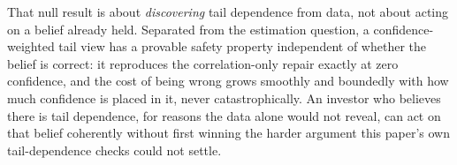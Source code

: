 \documentclass[11pt]{article}
\begin{document}
That null result is about \emph{discovering} tail dependence from data, not
about acting on a belief already held. Separated from the estimation
question, a confidence-weighted tail view has a provable safety property
independent of whether the belief is correct: it reproduces the
correlation-only repair exactly at zero confidence, and the cost of being
wrong grows smoothly and boundedly with how much confidence is placed in
it, never catastrophically. An investor who believes there is tail
dependence, for reasons the data alone would not reveal, can act on that
belief coherently without first winning the harder argument this paper's
own tail-dependence checks could not settle.

\printbibliography
\end{document}
